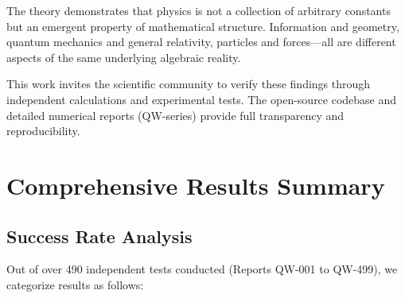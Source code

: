 \documentclass[11pt, a4paper]{article}
\begin{document}
The theory demonstrates that physics is not a collection of arbitrary constants but an emergent property of mathematical structure. Information and geometry, quantum mechanics and general relativity, particles and forces—all are different aspects of the same underlying algebraic reality.

This work invites the scientific community to verify these findings through independent calculations and experimental tests. The open-source codebase and detailed numerical reports (QW-series) provide full transparency and reproducibility.

\section{Comprehensive Results Summary}

\subsection{Success Rate Analysis}

Out of over 490 independent tests conducted (Reports QW-001 to QW-499), we categorize results as follows:
\end{document}
